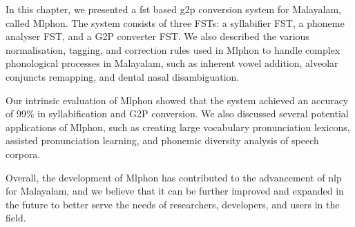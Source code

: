 In this chapter, we presented a \gls{fst} based \gls{g2p} conversion system for Malayalam, called Mlphon. The system consists of three FSTs: a syllabifier FST, a phoneme analyser FST, and a G2P converter FST. We also described the various normalisation, tagging, and correction rules used in Mlphon to handle complex phonological processes in Malayalam, such as inherent vowel addition, alveolar conjuncts remapping, and dental nasal disambiguation.

Our intrinsic evaluation of Mlphon showed that the system achieved an accuracy of 99\% in syllabification and G2P conversion. We also discussed several potential applications of Mlphon, such as creating large vocabulary pronunciation lexicons, assisted pronunciation learning, and phonemic diversity analysis of speech corpora.

Overall, the development of Mlphon has contributed to the advancement of \gls{nlp} for Malayalam, and we believe that it can be further improved and expanded in the future to better serve the needs of researchers, developers, and users in the field.

